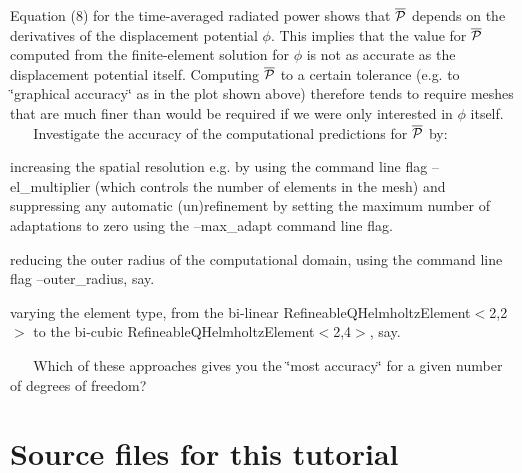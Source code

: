 \begin{DoxyItemize}
\item Equation (8) for the time-\/averaged radiated power shows that $ \overline{\cal P}$ depends on the derivatives of the displacement potential $ \phi $. This implies that the value for $ \overline{\cal P}$ computed from the finite-\/element solution for $ \phi $ is not as accurate as the displacement potential itself. Computing $ \overline{\cal P}$ to a certain tolerance (e.\+g. to \char`\"{}graphical accuracy\char`\"{} as in the plot shown above) therefore tends to require meshes that are much finer than would be required if we were only interested in $ \phi $ itself. ~\newline
~\newline
 Investigate the accuracy of the computational predictions for $ \overline{\cal P}$ by\+: ~\newline
~\newline

\begin{DoxyItemize}
\item increasing the spatial resolution e.\+g. by using the command line flag {\ttfamily --el\+\_\+multiplier} (which controls the number of elements in the mesh) and suppressing any automatic (un)refinement by setting the maximum number of adaptations to zero using the {\ttfamily --max\+\_\+adapt} command line flag. ~\newline
~\newline

\item reducing the outer radius of the computational domain, using the command line flag {\ttfamily --outer\+\_\+radius}, say. ~\newline
~\newline

\item varying the element type, from the bi-\/linear {\ttfamily Refineable\+Q\+Helmholtz\+Element$<$2,2$>$} to the bi-\/cubic {\ttfamily Refineable\+Q\+Helmholtz\+Element$<$2,4$>$}, say.
\end{DoxyItemize}~\newline
~\newline
 Which of these approaches gives you the \char`\"{}most accuracy\char`\"{} for a given number of degrees of freedom?
\end{DoxyItemize}

 

\hypertarget{index_sources}{}\section{Source files for this tutorial}\label{index_sources}

